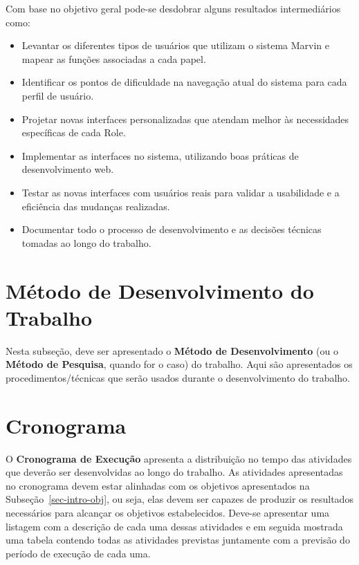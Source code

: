 Com base no objetivo geral pode-se desdobrar alguns resultados intermediários como:
\begin{itemize}
	\item Levantar os diferentes tipos de usuários que utilizam o sistema Marvin e mapear as funções associadas a cada papel.
	\item Identificar os pontos de dificuldade na navegação atual do sistema para cada perfil de usuário.
	\item Projetar novas interfaces personalizadas que atendam melhor às necessidades específicas de cada Role.
	\item Implementar as interfaces no sistema, utilizando boas práticas de desenvolvimento web.
	\item Testar as novas interfaces com usuários reais para validar a usabilidade e a eficiência das mudanças realizadas.
	\item Documentar todo o processo de desenvolvimento e as decisões técnicas tomadas ao longo do trabalho.
\end{itemize}




\section{Método de Desenvolvimento do Trabalho}
\label{sec-intro-met}

Nesta subseção, deve ser apresentado o \textbf{Método de Desenvolvimento} (ou o \textbf{Método de Pesquisa}, quando for o caso) do trabalho. Aqui são apresentados os procedimentos/técnicas que serão usados durante o desenvolvimento do trabalho. 

\section{Cronograma}
\label{sec-intro-crono}

O \textbf{Cronograma de Execução} apresenta a distribuição no tempo das atividades
que deverão ser desenvolvidas ao longo do trabalho. As atividades apresentadas no cronograma devem estar alinhadas com os objetivos apresentados na Subseção~\ref{sec-intro-obj}, ou seja, elas devem ser capazes de produzir os resultados necessários para alcançar os objetivos estabelecidos. Deve-se apresentar uma listagem com a descrição de cada uma dessas atividades e em seguida mostrada uma tabela contendo todas as atividades previstas juntamente com a  previsão do período de execução de cada uma.

